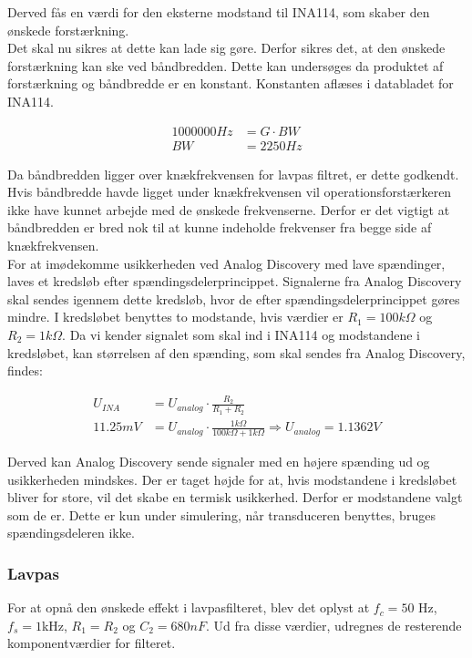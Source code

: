 Derved fås en værdi for den eksterne modstand til INA114, som skaber den ønskede forstærkning.\\
Det skal nu sikres at dette kan lade sig gøre. Derfor sikres det, at den ønskede forstærkning kan ske ved båndbredden. Dette kan undersøges da produktet af forstærkning og båndbredde er en konstant. Konstanten aflæses i databladet for INA114\cite{INA}. 
\begin{ceqn}
\begin{equation}
\begin{split}
1000000 Hz& = G\cdot BW \\
BW& = 2250 Hz
\end{split}
\end{equation}
\end{ceqn}
Da båndbredden ligger over knækfrekvensen for lavpas filtret, er dette godkendt. Hvis båndbredde havde ligget under knækfrekvensen vil operationsforstærkeren ikke have kunnet arbejde med de ønskede frekvenserne. Derfor er det vigtigt at båndbredden er bred nok til at kunne indeholde frekvenser fra begge side af knækfrekvensen.\\
\newline 
For at imødekomme usikkerheden ved Analog Discovery med lave spændinger, laves et kredsløb efter spændingsdelerprincippet. Signalerne fra Analog Discovery skal sendes igennem dette kredsløb, hvor de efter spændingsdelerprincippet gøres mindre. I kredsløbet benyttes to modstande, hvis værdier er $ R_1=100k\Omega $ og $ R_2 = 1k\Omega $. Da vi kender signalet som skal ind i INA114 og modstandene i kredsløbet, kan størrelsen af den spænding, som skal sendes fra Analog Discovery, findes:
\begin{ceqn}
\begin{equation}
\begin{split}
U_{INA}& = U_{analog} \cdot \frac{R_2}{R_1 + R_2} \\
11.25mV& = U_{analog}\cdot \frac{1k\Omega}{100k\Omega+1k\Omega} \Rightarrow U_{analog}=1.1362 V
\end{split}
\end{equation}
\end{ceqn}
Derved kan Analog Discovery sende signaler med en højere spænding ud og usikkerheden mindskes. Der er taget højde for at, hvis modstandene i kredsløbet bliver for store, vil det skabe en termisk usikkerhed. Derfor er modstandene valgt som de er. Dette er kun under simulering, når transduceren benyttes, bruges spændingsdeleren ikke.  
  
\subsubsection{Lavpas}
For at opnå den ønskede effekt i lavpasfilteret, blev det oplyst at $ f_c=50$ Hz, $ f_s = 1$kHz, $ R_1 = R_2 $ og $ C_2=680 nF$. Ud fra disse værdier, udregnes de resterende komponentværdier for filteret.

